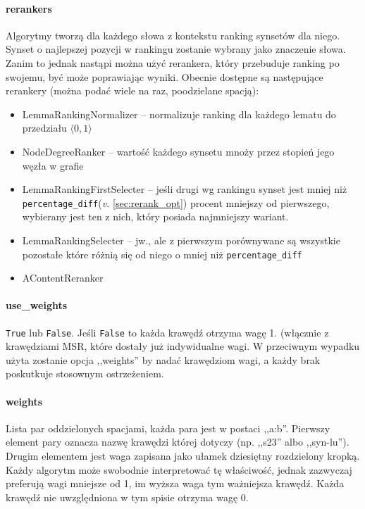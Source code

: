 \documentclass[10pt,a4paper]{article}
\begin{document}
\paragraph{rerankers}
Algorytmy tworzą dla każdego słowa z kontekstu ranking synsetów dla niego. Synset o najlepszej pozycji w rankingu zostanie wybrany jako znaczenie słowa. Zanim to jednak nastąpi można użyć rerankera, który przebuduje ranking po swojemu, być może poprawiając wyniki. Obecnie dostępne są następujące rerankery (można podać wiele na raz, poodzielane spacją):
\begin{itemize}
	\item LemmaRankingNormalizer -- normalizuje ranking dla każdego lematu do przedziału $\langle0, 1\rangle$
	\item NodeDegreeRanker -- wartość każdego synsetu mnoży przez stopień jego węzła w grafie
	\item LemmaRankingFirstSelecter -- jeśli drugi wg rankingu synset jest mniej niż \texttt{percentage\_diff}(\textit{v.} \ref{sec:rerank_opt}) procent mniejszy od pierwszego, wybierany jest ten z nich, który posiada najmniejszy wariant.
	\item LemmaRankingSelecter -- jw., ale z pierwszym porównywane są wszystkie pozostałe które różnią się od niego o mniej niż \texttt{percentage\_diff}
	\item AContentReranker  %
\end{itemize}


\paragraph{use\_weights}
\texttt{True} lub \texttt{False}. Jeśli \texttt{False} to każda krawędź otrzyma wagę 1. (włącznie z krawędziami MSR, które dostały już indywidualne wagi. W przeciwnym wypadku użyta zostanie opcja ,,weights'' by nadać krawędziom wagi, a każdy brak poskutkuje stosownym ostrzeżeniem.


\paragraph{weights}
Lista par oddzielonych spacjami, każda para jest w postaci ,,a:b''. Pierwszy element pary oznacza nazwę krawędzi której dotyczy (np. ,,s23'' albo ,,syn-lu''). Drugim elementem jest waga zapisana jako ułamek dziesiętny rozdzielony kropką. Każdy algorytm może swobodnie interpretować tę właściwość, jednak zazwyczaj preferują wagi mniejsze od 1, im wyższa waga tym ważniejsza krawędź. Każda krawędź nie uwzględniona w tym spisie otrzyma wagę 0.
\end{document}
